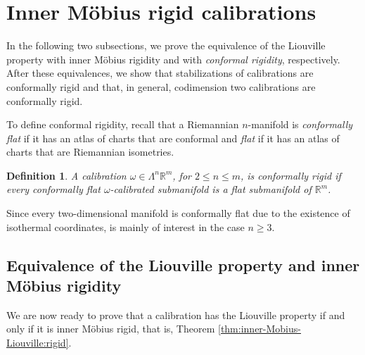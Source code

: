 \documentclass[a4paper,leqno,11pt]{amsart}
\numberwithin{equation}{section}
\newtheorem{definition}[theorem]{Definition}
\theoremstyle{remark}
\theoremstyle{remark}
\newcommand{\R}{\mathbb{R}}
\begin{document}



\section{Inner M\"obius rigid calibrations}
\label{sec:Liouville-property}

In the following two subsections, we prove the equivalence of the Liouville property with inner Möbius rigidity and with \emph{conformal rigidity}, respectively. After these equivalences, we show that stabilizations of calibrations are conformally rigid and that, in general, codimension two calibrations are conformally rigid.


To define conformal rigidity, recall that a Riemannian $n$-manifold is \emph{conformally flat} if it has an atlas of charts that are conformal and \emph{flat} if it has an atlas of charts that are Riemannian isometries. 

\begin{definition}\label{def:conf:rigid}
A calibration $\omega \in \Lambda^n\mathbb{R}^m$, for $2 \leq n \leq m$, is \emph{conformally rigid} if every conformally flat $\omega$-calibrated submanifold is a flat submanifold of $\R^m$.
\end{definition}
Since every two-dimensional manifold is conformally flat due to the existence of isothermal coordinates,  is mainly of interest in the case $n \geq 3$.


\subsection{Equivalence of the Liouville property and inner Möbius rigidity}
%
We are now ready to prove that a calibration has the Liouville property if and only if it is inner M\"obius rigid, that is, Theorem \ref{thm:inner-Mobius-Liouville:rigid}.


\innermob*
\end{document}
